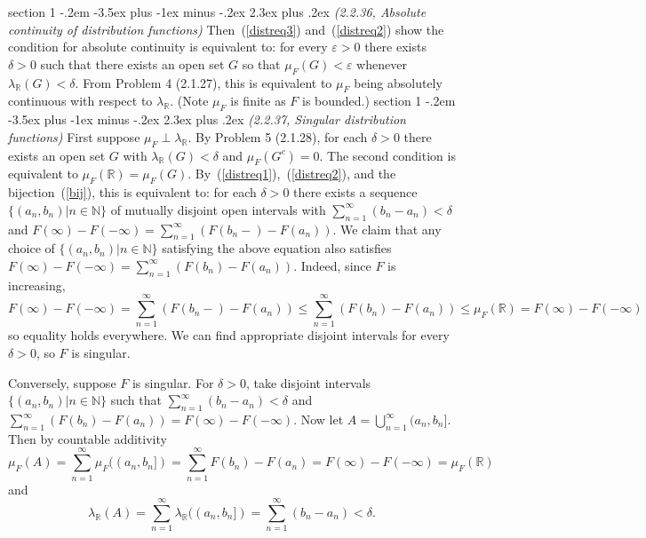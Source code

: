 \documentclass[12pt]{article}
\makeatletter
\theoremstyle{norm}
\newcommand{\N}[0]{\mathbb{N}}
\newcommand{\R}[0]{\mathbb{R}}
\newcommand{\subeq}[0]{\subseteq}
\newcommand{\de}[0]{\delta}
\newcommand{\ep}[0]{\varepsilon}
\newcommand{\la}[0]{\lambda}
\newcommand{\bs}[0]{\backslash}
\newenvironment{problem}{\@startsection
       {section}
       {1}
       {-.2em}
       {-3.5ex plus -1ex minus -.2ex}
       {2.3ex plus .2ex}
       {\pagebreak[3]%
       \large\bf\noindent{Problem }
       }
       }
       {%
       }
\makeatother
\begin{document}
\begin{problem}{\it(2.2.36, Absolute continuity of distribution functions)}
Then~(\ref{distreq3}) and~(\ref{distreq2}) show the condition for absolute continuity is equivalent to: for every $\ep>0$ there exists $\de>0$ such that there exists an open set $G$ so that $\mu_{F}(G)<\ep$ whenever $\la_{\R}(G)<\de$. 
From Problem 4 (2.1.27), this is equivalent to $\mu_{F}$ being absolutely continuous with respect to $\la_{\R}$. (Note $\mu_F$ is finite as $F$ is bounded.)%
\end{problem}
\begin{problem}{\it(2.2.37, Singular distribution functions)}
First suppose $\mu_F\perp \la_{\R}$. By Problem 5 (2.1.28), for each $\de>0$ there exists an open set $G$ with $\la_{\R}(G)<\de$ and $\mu_F(G^c)=0$. The second condition is equivalent to $\mu_F(\R)=\mu_F(G)$. By~(\ref{distreq1}),~(\ref{distreq2}), and the bijection~(\ref{bij}), this is equivalent to: for each $\de>0$ there exists a sequence $\{(a_n,b_n)|n\in \N\}$ of mutually disjoint open intervals with $\sum_{n=1}^{\infty} (b_n-a_n)<\de$ and $F(\infty)-F(-\infty)=\sum_{n=1}^{\infty} (F(b_n-)-F(a_n))$. 
We claim that any choice of $\{(a_n,b_n)|n\in \N\}$ satisfying the above equation also satisfies $F(\infty)-F(-\infty)=\sum_{n=1}^{\infty} (F(b_n)-F(a_n))$.
Indeed,
since $F$ is increasing,
\[ F(\infty)-F(-\infty)=\sum_{n=1}^{\infty}(F(b_n-)-F(a_n))
\leq
\sum_{n=1}^{\infty}(F(b_n)-F(a_n))\leq \mu_F(\R)=F(\infty)-F(-\infty)\]
so equality holds everywhere. We can find appropriate disjoint intervals for every $\de>0$, so $F$ is singular.

Conversely, suppose $F$ is singular. For $\de>0$, take disjoint intervals $\{(a_n,b_n)|n\in \N\}$ such that $\sum_{n=1}^{\infty}(b_n-a_n)<\de$ and $\sum_{n=1}^{\infty}(F(b_n)-F(a_n))=F(\infty)-F(-\infty)$. Now let $A=\bigcup_{n=1}^{\infty}(a_n,b_n]$. Then by countable additivity
\[
\mu_F(A)=\sum_{n=1}^{\infty} \mu_F((a_n,b_n])=\sum_{n=1}^{\infty} F(b_n)-F(a_n)=F(\infty)-F(-\infty)=\mu_F(\R)
\]
and
\[
\la_{\R}(A)=\sum_{n=1}^{\infty} \la_{\R}((a_n,b_n])=\sum_{n=1}^{\infty} (b_n-a_n)<\de.
\]


\end{problem}
\end{document}
